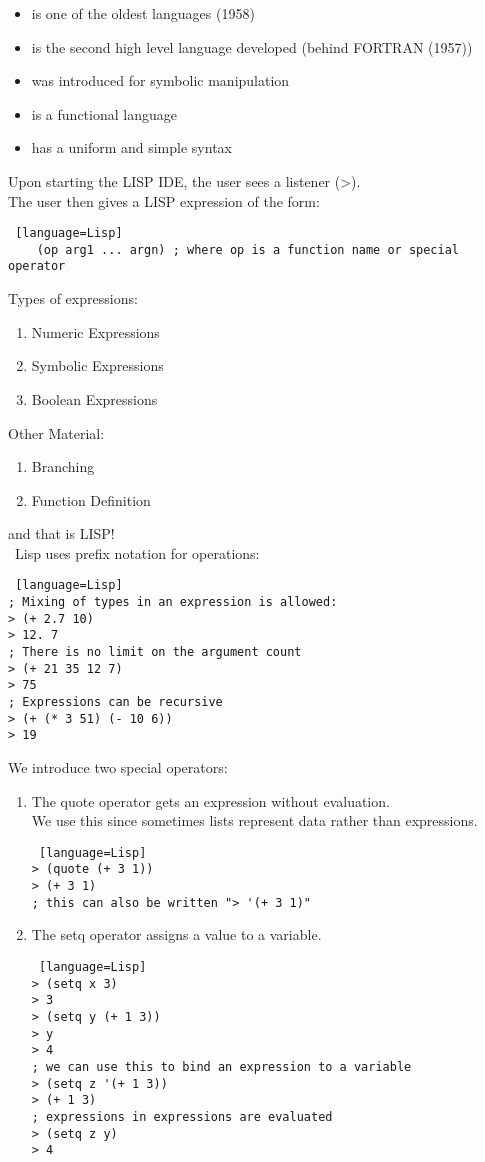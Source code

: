 \documentclass[../../lecture_notes.tex]{subfiles}
\begin{document}
\begin{itemize} [itemsep=0mm]
	\item is one of the oldest languages (1958)
	\item is the second high level language developed (behind FORTRAN (1957))
	\item was introduced for symbolic manipulation
	\item is a functional language
	\item has a uniform and simple syntax
\end{itemize} \medskip

\noindent Upon starting the LISP IDE, the user sees a listener (>).\\
The user then gives a LISP expression of the form:
\begin{lstlisting} [language=Lisp]
    (op arg1 ... argn) ; where op is a function name or special operator
\end{lstlisting} \medskip

\noindent Types of expressions:
\begin{enumerate}
\item Numeric Expressions
\item Symbolic Expressions
\item Boolean Expressions
\end{enumerate}

\noindent Other Material:
\begin{enumerate}
\item Branching 
\item Function Definition
\end{enumerate}
\noindent and that is LISP!\\
\
Lisp uses prefix notation for operations:
\begin{lstlisting} [language=Lisp]
; Mixing of types in an expression is allowed:
> (+ 2.7 10)
> 12. 7
; There is no limit on the argument count
> (+ 21 35 12 7)
> 75
; Expressions can be recursive
> (+ (* 3 51) (- 10 6))
> 19
\end{lstlisting} \medskip

\noindent We introduce two special operators:
\begin{enumerate} 
\item The quote operator gets an expression without evaluation.\\
	We use this since sometimes lists represent data rather than expressions.
\begin{lstlisting} [language=Lisp]
> (quote (+ 3 1))
> (+ 3 1)
; this can also be written "> '(+ 3 1)"
\end{lstlisting}
\item The setq operator assigns a value to a variable.
\begin{lstlisting} [language=Lisp]
> (setq x 3)
> 3
> (setq y (+ 1 3))
> y
> 4
; we can use this to bind an expression to a variable
> (setq z '(+ 1 3))
> (+ 1 3)
; expressions in expressions are evaluated
> (setq z y)
> 4
\end{lstlisting}
\end{enumerate} \medskip
\end{document}
